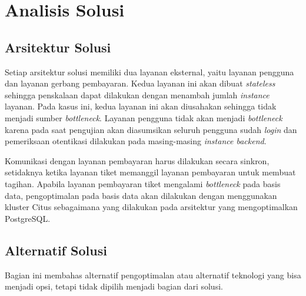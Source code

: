 \chapter{Analisis Solusi}

\section{Arsitektur Solusi}

Setiap arsitektur solusi memiliki dua layanan eksternal, yaitu layanan pengguna dan layanan gerbang pembayaran. Kedua layanan ini akan dibuat \textit{stateless} sehingga penskalaan dapat dilakukan dengan menambah jumlah \textit{instance} layanan. Pada kasus ini, kedua layanan ini akan diusahakan sehingga tidak menjadi sumber \textit{bottleneck}. Layanan pengguna tidak akan menjadi \textit{bottleneck} karena pada saat pengujian akan diasumsikan seluruh pengguna sudah \textit{login} dan pemeriksaan otentikasi dilakukan pada masing-masing \textit{instance backend}.

Komunikasi dengan layanan pembayaran harus dilakukan secara sinkron, setidaknya ketika layanan tiket memanggil layanan pembayaran untuk membuat tagihan. Apabila layanan pembayaran tiket mengalami \textit{bottleneck} pada basis data, pengoptimalan pada basis data akan dilakukan dengan menggunakan kluster Citus sebagaimana yang dilakukan pada arsitektur yang mengoptimalkan PostgreSQL.








\section{Alternatif Solusi}

Bagian ini membahas alternatif pengoptimalan atau alternatif teknologi yang bisa menjadi opsi, tetapi tidak dipilih menjadi bagian dari solusi.











